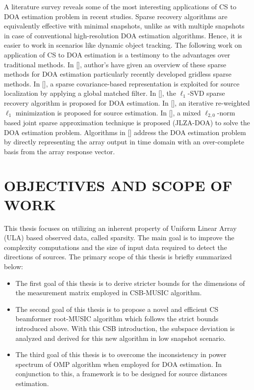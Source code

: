 \documentclass[12pt,a4paper]{article}
\theoremstyle{plain}
\theoremstyle{definition}
\begin{document}
A literature survey reveals some of the most interesting applications of CS to DOA estimation problem in recent studies. Sparse recovery algorithms are equivalently effective with minimal snapshots, unlike as with multiple snapshots in case of conventional high-resolution DOA estimation algorithms. Hence, it is easier to work in scenarios like dynamic object tracking. The following work on application of CS to DOA estimation is a testimony to the advantages over traditional methods. In [\citet{R19}], author's have given an overview of these sparse methods for DOA estimation particularly recently developed gridless sparse methods. In [\citet{R20,R21}], a sparse covariance-based representation is exploited for source localization by applying a global matched filter. In [\citet{R22}], the $\ell_1$-SVD sparse recovery algorithm is proposed for DOA estimation. In [\citet{R23,R24}], an iterative re-weighted $\ell_1$ minimization is proposed for source estimation. In [\citet{R25}], a mixed $\ell_{2,0}$-norm based joint sparse approximation technique is proposed (JLZA-DOA) to solve the DOA estimation problem. Algorithms in [\citet{R26,R27,R28}] address the DOA estimation problem by directly representing the array output in time domain with an over-complete basis from the array response vector.
%

\section{OBJECTIVES AND SCOPE OF WORK}
\label{binfib}
This thesis focuses on utilizing an inherent property of Uniform Linear Array (ULA) based observed data, called sparsity. The main goal is to improve the complexity computations and the size of input data required to detect the directions of sources. The primary scope of this thesis is briefly summarized below:

\begin{itemize}
\item The first goal of this thesis is to derive stricter bounds for the dimensions of the measurement matrix employed in CSB-MUSIC algorithm.

\item The second goal of this thesis is to propose a novel and efficient CS beamformer root-MUSIC algorithm which follows the strict bounds introduced above. With this CSB introduction, the subspace deviation is analyzed and derived for this new algorithm in low snapshot scenario.

\item The third goal of this thesis is to overcome the inconsistency in power spectrum of OMP algorithm when employed for DOA estimation. In conjunction to this, a framework is to be designed for source distances estimation.

\end{itemize}
\end{document}
